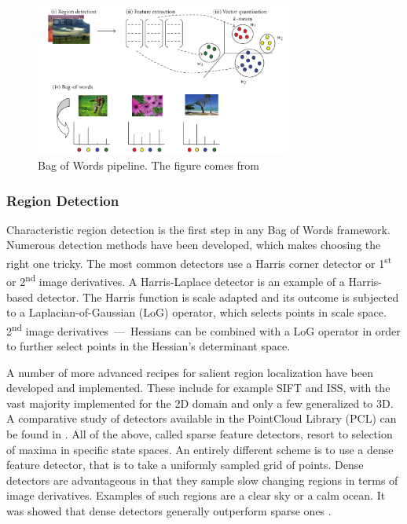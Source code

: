 \documentclass[12pt]{article}
\begin{document}
    \begin{figure}[!ht]
    \centering
    \includegraphics[width=0.75\textwidth]{figs/tsai2012}
    \caption{Bag of Words pipeline. The figure comes from \cite{tsai2012bag}}
    \label{fig:bow_pipeline}
    \end{figure}
	
  \subsubsection{Region Detection}
    Characteristic region detection is the first step in any Bag of Words 
framework. Numerous detection methods have been developed, which makes choosing 
the right one tricky. The most common detectors use a Harris corner detector or 
1\textsuperscript{st} or 2\textsuperscript{nd} image derivatives. A 
Harris-Laplace detector is an example of a Harris-based detector. The Harris 
function is scale adapted and its outcome is subjected to a 
Laplacian-of-Gaussian (LoG) operator, which selects points in scale space. 
2\textsuperscript{nd} image derivatives~---~Hessians can be combined with a LoG 
operator in order to further select points in the Hessian's determinant space.

    A number of more advanced recipes for salient region localization have been 
developed and implemented. These include for example SIFT
and ISS, with the vast majority 
implemented for the 2D domain and only a few generalized to 3D. A comparative 
study of detectors available in the PointCloud Library (PCL) can be found in 
\cite{pcl_keypoint_comparision, 3d_keypoint_eval}. All of the above, called 
sparse feature detectors, resort to selection of maxima in specific state 
spaces. An entirely different scheme is to use a dense feature detector, that 
is to take a uniformly sampled grid of points. Dense detectors are advantageous 
in that they sample slow changing regions in terms of image derivatives. 
Examples of such regions are a clear sky or a calm ocean. It was
showed that dense detectors generally outperform sparse ones 
\cite{tsai2012bag}.
    
\end{document}

